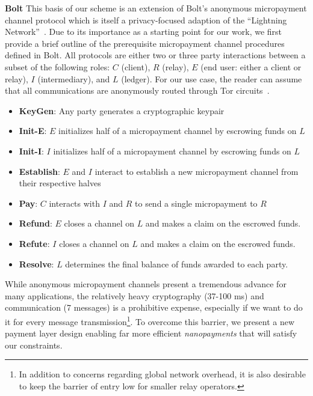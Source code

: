 \medskip \noindent\textbf{Bolt} This basis of our scheme is an extension of Bolt's anonymous micropayment channel protocol which is itself a privacy-focused adaption of the ``Lightning Network''~\cite{poon2016bitcoin}.
Due to its importance as a starting point for our work, we first provide a brief outline of the prerequisite micropayment channel procedures defined in Bolt.
All protocols are either two or three party interactions between a subset of the following roles: $C$ (client), $R$ (relay), $E$ (end user: either a client or relay), $I$ (intermediary), and $L$ (ledger).
For our use case, the reader can assume that all communications are anonymously routed through Tor circuits~\cite{green2017bolt}.

\begin{itemize}
\item \textbf{KeyGen}: Any party generates a cryptographic keypair
\item \textbf{Init-E}: $E$ initializes half of a micropayment channel by
  escrowing funds on $L$
\item \textbf{Init-I}: $I$ initializes half of a micropayment channel by
  escrowing funds on $L$
\item \textbf{Establish}: $E$ and $I$ interact to establish a new micropayment
  channel from their respective halves
\item \textbf{Pay}: $C$ interacts with $I$ and $R$ to send a single micropayment to $R$
\item \textbf{Refund}: $E$ closes a channel on $L$ and makes a claim on
  the escrowed funds.
\item \textbf{Refute}: $I$ closes a channel on $L$ and makes a claim on
  the escrowed funds.
\item \textbf{Resolve}: $L$ determines the final balance of funds awarded to
  each party.
\end{itemize}

While anonymous micropayment channels present a tremendous advance for many applications, the relatively heavy cryptography (37-100 ms) and communication (7 messages) is a prohibitive expense, especially if we want to do it for every message transmission\footnote{In addition to concerns regarding global network overhead, it is also desirable to keep the barrier of entry low for smaller relay operators.}.
To overcome this barrier, we present a new payment layer design enabling far more efficient \emph{nanopayments} that will satisfy our constraints.

